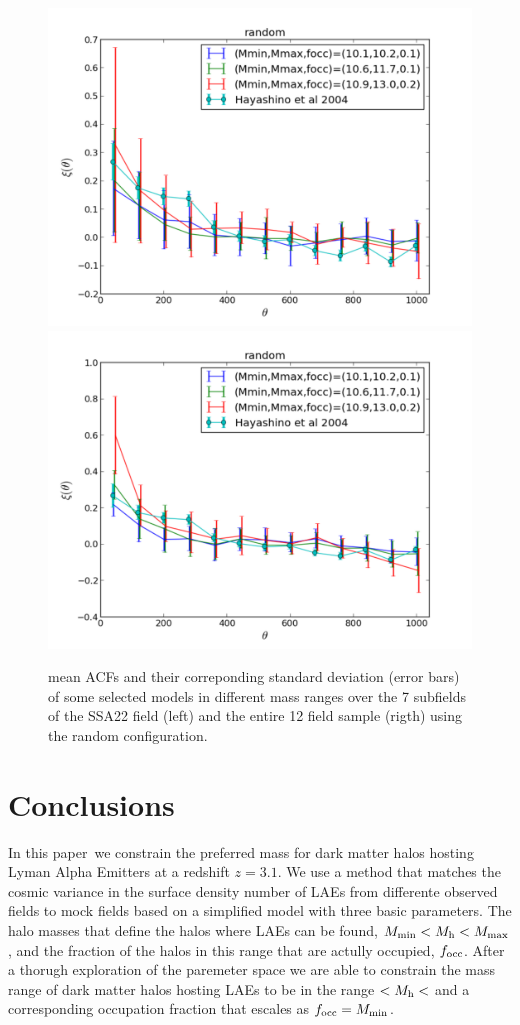 \documentclass[usenatbib]{mn2e}
\newcommand{\documentname}{paper~}
\begin{document}
\begin{figure}
\begin{center}
\includegraphics[width=0.46\linewidth,angle=0]{./plots/random_large_correlation_selected_models.pdf}
\hspace{5mm}
\includegraphics[width=0.46\linewidth,angle=0]{./plots/random_full_correlation_selected_models.pdf}
\end{center} 
\caption{ mean ACFs   and their correponding standard deviation (error bars)  of some selected models in different mass ranges
over the 7 subfields of the SSA22 field (left) and the entire 12 field sample (rigth) using the
random configuration. \label{figure:correlation_random} }
 
\end{figure}



\section{Conclusions}
In this \documentname we constrain the preferred mass for dark matter
halos hosting Lyman Alpha Emitters at a redshift $z=3.1$. We use a
method that matches the cosmic variance in the surface
density number of LAEs from differente observed fields to mock fields
based on a simplified model with three basic parameters. The halo
masses that define the halos where LAEs can be found, $M_{\rm
  min}<M_{\rm h}<M_{\rm max}$, and the fraction of the halos in this
range that are actully occupied, $f_{\rm occ}$. After a thorugh
exploration of the paremeter space we are able to constrain the mass
range of dark matter halos hosting LAEs to be in the range $<M_{\rm
  h}<$ and a corresponding occupation fraction that escales as $f_{\rm
  occ} = M_{\rm min}$. 
\end{document}
